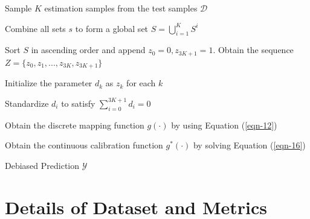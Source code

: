 \documentclass[sigconf]{acmart}
\begin{document}
\begin{algorithm}[t]
	\caption{Calibration process of CalibraEval}
	\label{algo}
        
        Sample $K$ estimation samples from the test samples $\mathcal{D}$


        Combine all sets $s$ to form a global set $S = \bigcup_{i=1}^K S^i$


       Sort $S$ in ascending order and append $z_0=0, z_{3K+1}=1$. Obtain the sequence $Z = \{z_0,z_1,...,z_{3K},z_{3K+1}\}$
        
        Initialize the parameter $d_k$ as $z_k$ for each $k$


    Standardize $d_i$ to satisfy $\sum_{i=0}^{3K+1}d_i = 0$

    Obtain the discrete mapping function $g(\cdot)$ by using Equation (\ref{eqn-12})

    Obtain the continuous calibration function $g^*(\cdot)$ by solving Equation (\ref{eqn-16})


    \Return Debiased Prediction $\mathcal{Y}$
\end{algorithm}


\section{Details of Dataset and Metrics}
\label{details}
\end{document}

